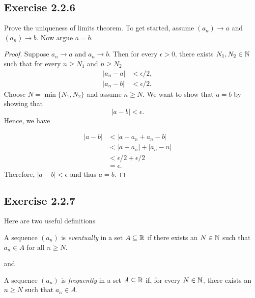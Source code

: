 \subsection{Exercise 2.2.6}
Prove the uniqueness of limits theorem. To get started, assume \( (a_n) \to a \) and \( (a_n) \to b \). Now argue \( a = b \).
\begin{proof}
Suppose \( a_n \to a \) and \( a_n \to b \). Then for every \( \epsilon  > 0 \), there exists \( N_1, N_2 \in \mathbb{N} \) such that for every \( n \geq N_1 \) and \( n \geq N_2\)
\begin{align*}
    | a_n - a |  &< \epsilon /2, \\
    | a_n - b  | &< \epsilon / 2. 
\end{align*}
Choose \( N = \min \{ N_1, N_2 \}\) and assume \( n \geq N \). We want to show that \( a = b \) by showing that 
\[ | a - b  | < \epsilon. \]
Hence, we have 

\begin{align*}
   |a - b | &< | a - a_n + a_n - b | \\
            &< |a - a_n| + |a_n - n | \tag{Triangle Inequality}\\  
            &< \epsilon /2 + \epsilon /2 \tag{ \( a_n \to a \), \( a_n \to b\)} \\ 
            &= \epsilon.
\end{align*}
Therefore, \( | a - b  | < \epsilon  \) and thus \( a = b \).

\end{proof}
\subsection{Exercise 2.2.7}

Here are two useful definitions 
\begin{tcolorbox}
\begin{defn}
A sequence \( (a_n)\) is \textit{eventually} in a set \( A \subseteq \mathbb{R} \) if there exists an \( N \in \mathbb{N} \) such that \( a_n \in A \) for all \( n \geq N \).
\end{defn}
\end{tcolorbox}

and

\begin{tcolorbox}
\begin{defn}
A sequence \( (a_n)\) is \textit{frequently} in a set \( A \subseteq \mathbb{R} \) if, for every \( N \in \mathbb{N} \), there exists an \( n \geq N \) such that \( a_n \in A \).
\end{defn}
\end{tcolorbox}

